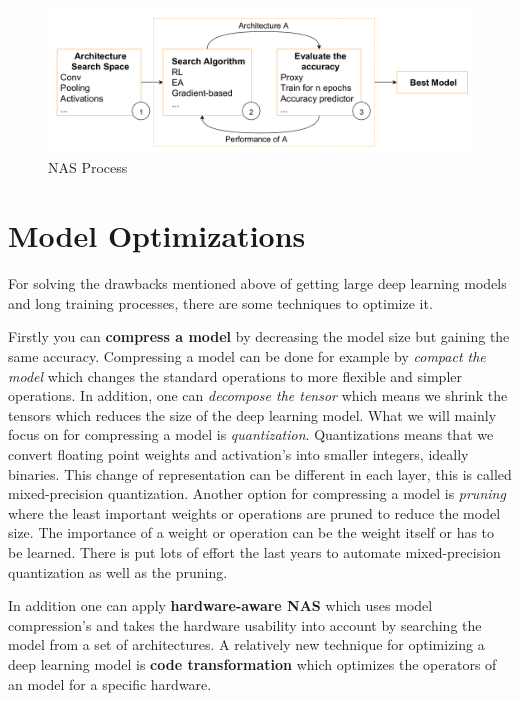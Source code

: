 \documentclass[conference]{IEEEtran}
\begin{document}
\begin{figure}[htbp]
\centerline{\includegraphics[width=\linewidth]{NASProcess.png}}
\caption{NAS Process\cite{bib1}}
\label{fig:NASProcess}
\end{figure}

\section{Model Optimizations}
\label{section:ModelOptimization}
For solving the drawbacks mentioned above of getting large deep learning models and long training processes, there are some techniques to optimize it.

Firstly you can \textbf{compress a model} by decreasing the model size but gaining the same accuracy. Compressing a model can be done for example by \textit{compact the model} which changes the standard operations to more flexible and simpler operations. In addition, one can \textit{decompose the tensor} which means we shrink the tensors which reduces the size of the deep learning model. What we will mainly focus on for compressing a model is \textit{quantization}. Quantizations means that we convert floating point weights and activation's into smaller integers, ideally binaries. This change of representation can be different in each layer, this is called mixed-precision quantization. Another option for compressing a model is \textit{pruning} where the least important weights or operations are pruned to reduce the model size. The importance of a weight or operation can be the weight itself or has to be learned. There is put lots of effort the last years to automate mixed-precision quantization as well as the pruning. 

In addition one can apply \textbf{hardware-aware NAS} which uses model compression's and takes the hardware usability into account by searching the model from a set of architectures. A relatively new technique for optimizing a deep learning model is \textbf{code transformation} which optimizes the operators of an model for a specific hardware.
\end{document}
